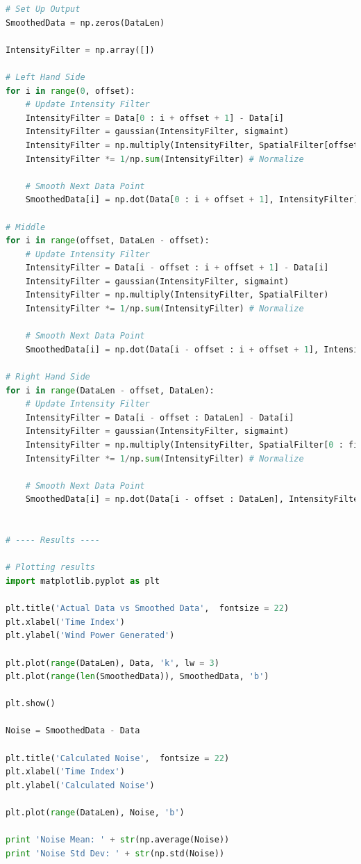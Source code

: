 \documentclass[11pt]{article}
\theoremstyle{definition}
\begin{document}
\begin{lstlisting}[language = Python]
# Set Up Output
SmoothedData = np.zeros(DataLen)

IntensityFilter = np.array([])

# Left Hand Side
for i in range(0, offset):
    # Update Intensity Filter
    IntensityFilter = Data[0 : i + offset + 1] - Data[i]
    IntensityFilter = gaussian(IntensityFilter, sigmaint)
    IntensityFilter = np.multiply(IntensityFilter, SpatialFilter[offset - i : filtersize])
    IntensityFilter *= 1/np.sum(IntensityFilter) # Normalize

    # Smooth Next Data Point
    SmoothedData[i] = np.dot(Data[0 : i + offset + 1], IntensityFilter)

# Middle
for i in range(offset, DataLen - offset):
    # Update Intensity Filter
    IntensityFilter = Data[i - offset : i + offset + 1] - Data[i]
    IntensityFilter = gaussian(IntensityFilter, sigmaint)
    IntensityFilter = np.multiply(IntensityFilter, SpatialFilter)
    IntensityFilter *= 1/np.sum(IntensityFilter) # Normalize

    # Smooth Next Data Point
    SmoothedData[i] = np.dot(Data[i - offset : i + offset + 1], IntensityFilter)

# Right Hand Side
for i in range(DataLen - offset, DataLen):
    # Update Intensity Filter
    IntensityFilter = Data[i - offset : DataLen] - Data[i]
    IntensityFilter = gaussian(IntensityFilter, sigmaint)
    IntensityFilter = np.multiply(IntensityFilter, SpatialFilter[0 : filtersize - (i - DataLen + offset) - 1])
    IntensityFilter *= 1/np.sum(IntensityFilter) # Normalize

    # Smooth Next Data Point
    SmoothedData[i] = np.dot(Data[i - offset : DataLen], IntensityFilter)


# ---- Results ----

# Plotting results
import matplotlib.pyplot as plt

plt.title('Actual Data vs Smoothed Data',  fontsize = 22)
plt.xlabel('Time Index')
plt.ylabel('Wind Power Generated')

plt.plot(range(DataLen), Data, 'k', lw = 3)
plt.plot(range(len(SmoothedData)), SmoothedData, 'b')

plt.show()

Noise = SmoothedData - Data

plt.title('Calculated Noise',  fontsize = 22)
plt.xlabel('Time Index')
plt.ylabel('Calculated Noise')

plt.plot(range(DataLen), Noise, 'b')

print 'Noise Mean: ' + str(np.average(Noise))
print 'Noise Std Dev: ' + str(np.std(Noise))


\end{lstlisting}
\end{document}
